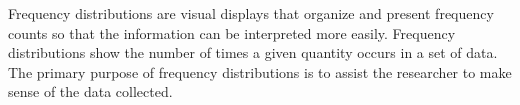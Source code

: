 Frequency distributions are visual displays that organize and present frequency 
counts so that the information can be interpreted more easily. Frequency distributions 
show the number of times a given quantity occurs in a set of data. The primary 
purpose of frequency distributions is to assist the researcher to make sense of 
the data collected.